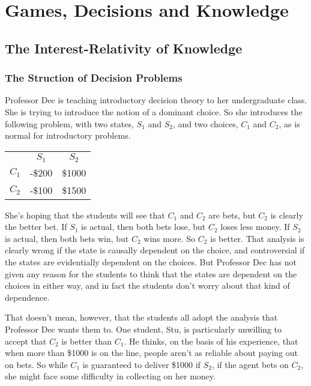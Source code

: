 \chapter{Games, Decisions and Knowledge}

\section{The Interest-Relativity of Knowledge}

\subsection{The Struction of Decision Problems}

Professor Dec is teaching introductory decision theory to her undergraduate class. She is trying to introduce the notion of a dominant choice. So she introduces the following problem, with two states, $S_1$ and $S_2$, and two choices, $C_1$ and $C_2$, as is normal for introductory problems.

\begin{center}
\begin{tabular}{r c c}
 & $S_1$ & $S_2$ \\
$C_1$ & -\$200 & \$1000 \\
$C_2$ & -\$100 & \$1500 
\end{tabular}
\end{center}

\noindent She's hoping that the students will see that $C_1$ and $C_2$ are bets, but $C_2$ is clearly the better bet. If $S_1$ is actual, then both bets lose, but $C_2$ loses less money. If $S_2$ is actual, then both bets win, but $C_2$ wins more. So $C_2$ is better. That analysis is clearly wrong if the state is causally dependent on the choice, and controversial if the states are evidentially dependent on the choices. But Professor Dec has not given any reason for the students to think that the states are dependent on the choices in either way, and in fact the students don't worry about that kind of dependence.

That doesn't mean, however, that the students all adopt the analysis that Professor Dec wants them to. One student, Stu, is particularly unwilling to accept that $C_2$ is better than $C_1$. He thinks, on the basis of his experience, that when more than \$1000 is on the line, people aren't as reliable about paying out on bets. So while $C_1$ is guaranteed to deliver \$1000 if $S_2$, if the agent bets on $C_2$, she might face some difficulty in collecting on her money.

